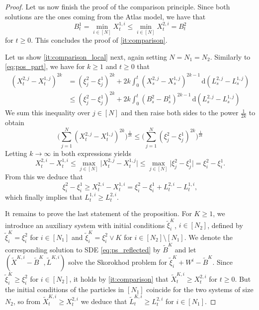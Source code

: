 \documentclass[11pt, a4paper]{article}
\theoremstyle{plain}
\theoremstyle{definition}
\theoremstyle{remark}
\numberwithin{equation}{section}
\renewcommand{\d}{\mathrm{d}}
\begin{document}
\begin{proof}
Let us now finish the proof of the comparison principle. Since both solutions are the ones coming from the Atlas model, we have that
\begin{equation*}
    B^1_t = \min_{i \in [N]} X^{1, i}_t \leq \min_{i \in [N]} X^{2, i}_t = B^2_t
\end{equation*}
for $t \geq 0$. This concludes the proof of \ref{it:comparison}.

Let us show \ref{it:comparison_local} next, again setting $N = N_1 = N_2$. Similarly to \eqref{eq:pos_part}, we have for $k 
\geq 1$ and $t \geq 0$ that
\begin{align*}
    (X^{2, j}_t - X^{1, j}_t)^{2k} &= (\xi^2_j - \xi^1_j)^{2k} + 2k \int_0^t (X^{2, j}_s - X^{1, j}_s)^{2k - 1} \, \d (L^{2, j}_s - L^{1, j}_s) \\
    &\leq (\xi^2_j - \xi^1_j)^{2k} + 2k \int_0^t (B^2_s - B^1_s)^{2k - 1} \, \d (L^{2, j}_s - L^{1, j}_s)
\end{align*}
We sum this inequality over $j \in [N]$ and then raise both sides to the power $\frac{1}{2k}$ to obtain
\begin{equation*}
    \biggl(\sum_{j = 1}^N (X^{2, j}_t - X^{1, j}_t)^{2k}\biggr)^{\frac{1}{2k}} \leq \biggl(\sum_{j = 1}^N (\xi^2_j - \xi^1_j)^{2k} \biggr)^{\frac{1}{2k}}
\end{equation*}
Letting $k \to \infty$ in both expressions yields
\begin{equation*}
    X^{2, i}_t - X^{1, i}_t \leq \max_{j \in [N]} \lvert X^{2, j}_t - X^{1, j}_t \rvert \leq \max_{j \in [N]} \vert \xi^2_j - \xi^1_j\rvert = \xi^2_i - \xi^1_i.
\end{equation*}
From this we deduce that
\begin{equation*}
    \xi^2_i - \xi^1_i \geq X^{2, i}_t - X^{1, i}_t = \xi^2_i - \xi^1_i + L^{2, i}_t - L^{1, i}_t,
\end{equation*}
which finally implies that $L^{1, i}_t \geq L^{2, i}_t$. 

It remains to prove the last statement of the proposition. For $K \geq 1$, we introduce an auxiliary system with initial conditions $\tilde{\xi}^K_i$, $i \in [N_2]$, defined by $\tilde{\xi}^K_i = \xi^2_i$ for $i \in [N_1]$ and $\tilde{\xi}^K_i = \xi^2_i \lor K$ for $i \in [N_2] \setminus [N_1]$. We denote the corresponding solution to SDE \eqref{eq:ps_reflected} by $\tilde{B}^K$ and let $(\tilde{X}^{K, i} - \tilde{B}^K, \tilde{L}^{K, i})$ solve the Skorokhod problem for $\tilde{\xi}^K_i + W^i - \tilde{B}^K$. Since $\tilde{\xi}^K_i \geq \xi^2_i$ for $i \in [N_2]$, it holds by \ref{it:comparison} that $\tilde{X}^{K, i}_t \geq X^{2, i}_t$ for $t \geq 0$. But the initial conditions of the particles in $[N_1]$ coincide for the two systems of size $N_2$, so from $\tilde{X}^{K, i}_t \geq X^{2, i}_t$ we deduce that $\tilde{L}^{K, i}_t \geq L^{2, i}_t$ for $i \in [N_1]$. 


\end{proof}
\end{document}
